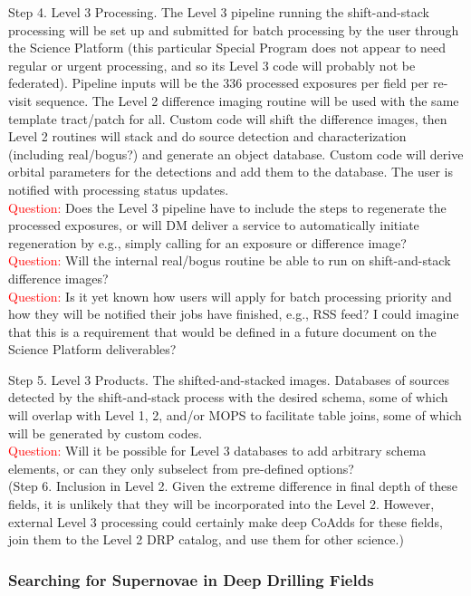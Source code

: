 \documentclass[DM,lsstdraft,toc]{lsstdoc}
\begin{document}
Step 4. Level 3 Processing. The Level 3 pipeline running the shift-and-stack processing will be set up and submitted for batch processing by the user through the Science Platform (this particular Special Program does not appear to need regular or urgent processing, and so its Level 3 code will probably not be federated). Pipeline inputs will be the 336 processed exposures per field per re-visit sequence. The Level 2 difference imaging routine will be used with the same template tract/patch for all. Custom code will shift the difference images, then Level 2 routines will stack and do source detection and characterization (including real/bogus?) and generate an object database. Custom code will derive orbital parameters for the detections and add them to the database. The user is notified with processing status updates. \\
\textcolor{red}{Question:} Does the Level 3 pipeline have to include the steps to regenerate the processed exposures, or will DM deliver a service to automatically initiate regeneration by e.g., simply calling for an exposure or difference image? \\
\textcolor{red}{Question:} Will the internal real/bogus routine be able to run on shift-and-stack difference images? \\
\textcolor{red}{Question:} Is it yet known how users will apply for batch processing priority and how they will be notified their jobs have finished, e.g., RSS feed? I could imagine that this is a requirement that would be defined in a future document on the Science Platform deliverables?

Step 5. Level 3 Products. The shifted-and-stacked images. Databases of sources detected by the shift-and-stack process with the desired schema, some of which will overlap with Level 1, 2, and/or MOPS to facilitate table joins, some of which will be generated by custom codes. \\
\textcolor{red}{Question:} Will it be possible for Level 3 databases to add arbitrary schema elements, or can they only subselect from pre-defined options? \\

(Step 6. Inclusion in Level 2. Given the extreme difference in final depth of these fields, it is unlikely that they will be incorporated into the Level 2. However, external Level 3 processing could certainly make deep CoAdds for these fields, join them to the Level 2 DRP catalog, and use them for other science.)

\subsubsection{Searching for Supernovae in Deep Drilling Fields}
\end{document}
